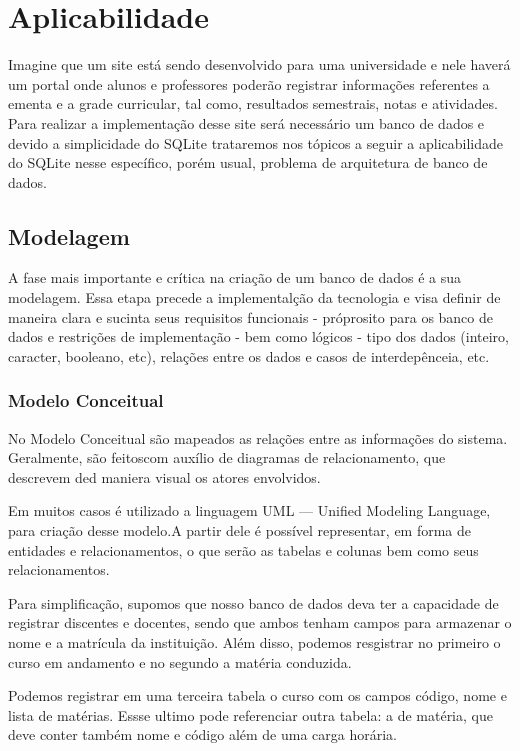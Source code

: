 \documentclass[12pt]{article}
\begin{document}
\section{Aplicabilidade}

Imagine que um site está sendo desenvolvido para uma universidade e nele haverá um portal onde alunos e professores poderão registrar informações referentes a ementa e a grade curricular, tal como, resultados semestrais, notas e atividades. Para realizar a implementação desse site será necessário um banco de dados e devido a simplicidade do SQLite trataremos nos tópicos a seguir a aplicabilidade do SQLite nesse específico, porém usual, problema de arquitetura de banco de dados.

\subsection{Modelagem}

A fase mais importante e crítica na criação de um banco de dados é a sua modelagem. Essa etapa precede a implementalção da tecnologia e visa definir de maneira clara e sucinta seus requisitos funcionais - próprosito para os banco de dados e restrições de implementação - bem como lógicos - tipo dos dados (inteiro, caracter, booleano, etc), relações entre os dados e casos de interdepênceia, etc.

\subsubsection{Modelo Conceitual}

No Modelo Conceitual são mapeados as relações entre as informações do sistema. Geralmente, são feitoscom auxílio de diagramas de relacionamento, que descrevem ded maniera visual os atores envolvidos. 

Em muitos casos é utilizado a linguagem UML — Unified Modeling Language, para criação desse modelo.A partir dele é possível representar, em forma de entidades e relacionamentos, o que serão as tabelas e colunas bem como seus relacionamentos.

Para simplificação, supomos que nosso banco de dados deva ter a capacidade de registrar discentes e docentes, sendo que ambos tenham campos para armazenar o nome e a matrícula da instituição. Além disso, podemos resgistrar no primeiro o curso em andamento e no segundo a matéria conduzida.

Podemos registrar em uma terceira tabela o curso com os campos código, nome e lista de matérias. Essse ultimo pode referenciar outra tabela: a de matéria, que deve conter também nome e código além de uma carga horária.
\end{document}
